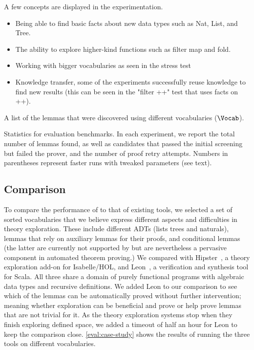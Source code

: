 A few concepts are displayed in the experimentation.
\begin{itemize}
    \item Being able to find basic facts about new data types such as Nat, List, and Tree.
    \item The ability to explore higher-kind functions such as filter map and fold.
    \item Working with bigger vocabularies as seen in the stress test
    \item Knowledge transfer, some of the experiments successfully reuse knowledge to find new results (this can be seen in the "filter ++" test that uses facts on ++).
\end{itemize}

\begin{table}
\resizebox{\textwidth}{!}{

}
\caption{A list of the lemmas that were discovered using different vocabularies ($\Vocab$).}
\label{eval:all-lemmas}
\end{table}

\begin{table}[t]
\resizebox{0.9\textwidth}{!}{

}

\smallskip
\caption{Statistics for evaluation benchmarks.
In each experiment, we report the total number of lemmas found, as well as candidates that passed the initial screening but failed the prover, and the number of proof retry attempts.
Numbers in parentheses represent faster runs with tweaked parameters (see text).
}
\label{table:experiments}
\end{table}

\subsection{Comparison}
\label{results:comparison}

To compare the performance of \TheSy to that of existing tools, we selected a set of sorted vocabularies that we believe express different aspects and difficulties in theory exploration.
These include different ADTs (lists trees and naturals), lemmas that rely on auxiliary lemmas for their proofs, and conditional lemmas (the latter are currently not supported by \TheSy but are nevertheless a pervasive component in automated theorem proving.)
We compared \TheSy with Hipster~\cite{ITP2017:Johansson}, a theory exploration add-on for Isabelle/HOL, and Leon~\cite{SCALA13:Blanc}, a verification and synthesis tool for Scala.
All three share a domain of purely functional programs with algebraic data types and recursive definitions.
We added Leon to our comparison to see which of the lemmas can be automatically proved without further intervention;
meaning whether exploration can be beneficial and prove or help prove lemmas that are not trivial for it.
As the theory exploration systems stop when they finish exploring defined space, we added a timeout of half an hour for Leon to keep the comparison close.
\autoref{eval:case-study} shows the results of running the three tools on different vocabularies.

